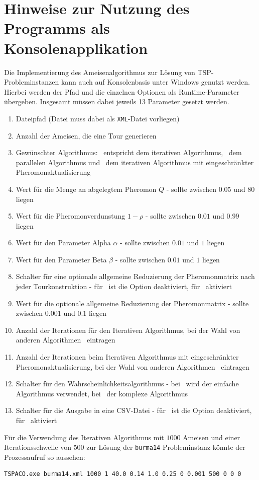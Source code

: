 \documentclass[doktyp=barbeit, sprache=german]{TUBAFarbeiten}
\begin{document}
\section{Hinweise zur Nutzung des Programms als Konsolenapplikation}
Die Implementierung des Ameisenalgorithmus zur Lösung von TSP-Probleminstanzen kann auch auf Konsolenbasis unter Windows genutzt werden. Hierbei werden der Pfad und die einzelnen Optionen als Runtime-Parameter übergeben. Insgesamt müssen dabei jeweils 13 Parameter gesetzt werden.
\begin{enumerate}
\item Dateipfad (Datei muss dabei als \texttt{XML}-Datei vorliegen)
\item Anzahl der Ameisen, die eine Tour generieren
\item Gewünschter Algorithmus: \grqq\, entspricht dem iterativen Algorithmus, \grqq\, dem parallelen Algorithmus und \grqq\, dem iterativen Algorithmus mit eingeschränkter Pheromonaktualisierung
\item Wert für die Menge an abgelegtem Pheromon $Q$ - sollte zwischen $0.05$ und $80$ liegen
\item Wert für die Pheromonverdunstung $1 - \rho$ - sollte zwischen $0.01$ und $0.99$ liegen
\item Wert für den Parameter Alpha $\alpha$ - sollte zwischen $0.01$ und $1$ liegen
\item Wert für den Parameter Beta $\beta$ - sollte zwischen $0.01$ und $1$ liegen
\item Schalter für eine optionale allgemeine Reduzierung der Pheromonmatrix nach jeder Tourkonstruktion - für \grqq\, ist die Option deaktiviert, für \grqq\, aktiviert
\item Wert für die optionale allgemeine Reduzierung der Pheromonmatrix - sollte zwischen $0.001$ und $0.1$ liegen
\item Anzahl der Iterationen für den Iterativen Algorithmus, bei der Wahl von anderen Algorithmen \grqq\, eintragen
\item Anzahl der Iterationen beim Iterativen Algorithmus mit eingeschränkter Pheromonaktualisierung, bei der Wahl von anderen Algorithmen \grqq\, eintragen
\item Schalter für den Wahrscheinlichkeitsalgorithmus - bei \grqq\, wird der einfache Algorithmus verwendet, bei \grqq\, der komplexe Algorithmus
\item Schalter für die Ausgabe in eine CSV-Datei - für \grqq\, ist die Option deaktiviert, für \grqq\, aktiviert
\end{enumerate}
Für die Verwendung des Iterativen Algorithmus mit $1000$ Ameisen und einer Iterationsschwelle von $500$ zur Lösung der \texttt{burma14}-Probleminstanz könnte der Prozessaufruf so aussehen:
\begin{lstlisting}
TSPACO.exe burma14.xml 1000 1 40.0 0.14 1.0 0.25 0 0.001 500 0 0 0
\end{lstlisting}
\newpage
\end{document}
